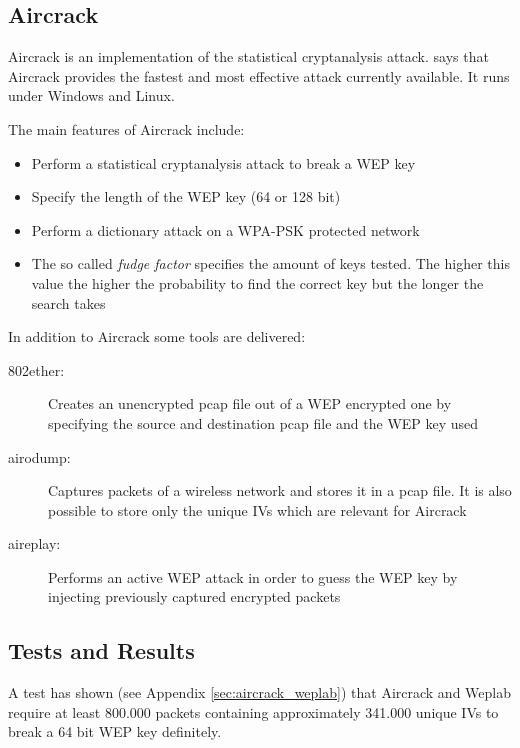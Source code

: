 \subsection*{Aircrack}

Aircrack is an implementation of the statistical cryptanalysis attack. \cite{wep_dead_1} says that Aircrack provides the fastest and most effective attack currently available. It runs under Windows and Linux.

The main features of Aircrack include:

\begin{itemize}
	\addtolength{\itemsep}{-1.5ex}

	\item Perform a statistical cryptanalysis attack to break a WEP key
	\item Specify the length of the WEP key (64 or 128 bit)
	\item Perform a dictionary attack on a WPA-PSK protected network
	\item The so called {\em fudge factor} specifies the amount of keys tested. The higher this value the higher the probability to find the correct key but the longer the search takes
\end{itemize}

In addition to Aircrack some tools are delivered:

\begin{description}
	\item [802ether:] Creates an unencrypted pcap file out of a WEP encrypted one by specifying the source and destination pcap file and the WEP key used
	\item [airodump:] Captures packets of a wireless network and stores it in a pcap file. It is also possible to store only the unique IVs which are relevant for Aircrack
	\item [aireplay:] Performs an active WEP attack in order to guess the WEP key by injecting previously captured encrypted packets
\end{description}

\subsection*{Tests and Results}

A test has shown (see Appendix \ref{sec:aircrack_weplab}) that Aircrack and Weplab require at least 800.000 packets containing approximately 341.000 unique IVs to break a 64 bit WEP key definitely.

